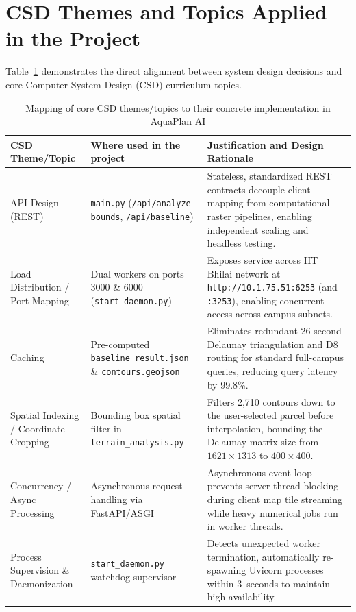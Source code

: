 \documentclass[manuscript,screen,review]{acmart}
\begin{document}
\section{CSD Themes and Topics Applied in the Project}
\label{sec:csd-themes}
Table~\ref{tab:csd-themes} demonstrates the direct alignment between system design decisions and core Computer System Design (CSD) curriculum topics.

\begin{table}[t]
  \caption{Mapping of core CSD themes/topics to their concrete implementation in AquaPlan AI}
  \label{tab:csd-themes}
  \begin{tabular}{p{3.2cm}p{5.0cm}p{6.8cm}}
    \toprule
    CSD Theme/Topic & Where used in the project & Justification and Design Rationale \\
    \midrule
    API Design (REST) & \texttt{main.py} (\texttt{/api/analyze-bounds}, \texttt{/api/baseline}) & Stateless, standardized REST contracts decouple client mapping from computational raster pipelines, enabling independent scaling and headless testing. \\
    Load Distribution / Port Mapping & Dual workers on ports 3000 \& 6000 (\texttt{start\_daemon.py}) & Exposes service across IIT Bhilai network at \texttt{http://10.1.75.51:6253} (and \texttt{:3253}), enabling concurrent access across campus subnets. \\
    Caching & Pre-computed \texttt{baseline\_result.json} \& \texttt{contours.geojson} & Eliminates redundant 26-second Delaunay triangulation and D8 routing for standard full-campus queries, reducing query latency by 99.8\%. \\
    Spatial Indexing / Coordinate Cropping & Bounding box spatial filter in \texttt{terrain\_analysis.py} & Filters 2,710 contours down to the user-selected parcel before interpolation, bounding the Delaunay matrix size from $1621 \times 1313$ to $400 \times 400$. \\
    Concurrency / Async Processing & Asynchronous request handling via FastAPI/ASGI & Asynchronous event loop prevents server thread blocking during client map tile streaming while heavy numerical jobs run in worker threads. \\
    Process Supervision \& Daemonization & \texttt{start\_daemon.py} watchdog supervisor & Detects unexpected worker termination, automatically re-spawning Uvicorn processes within 3~seconds to maintain high availability. \\

\end{tabular}
\end{table}
\end{document}
